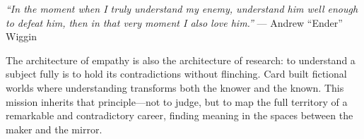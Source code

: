 \documentclass[11pt,letterpaper]{article}
\begin{document}
\vspace{1em}

\begin{quotebox}
\textit{``In the moment when I truly understand my enemy, understand him well enough to defeat him, then in that very moment I also love him.''} --- Andrew ``Ender'' Wiggin

\vspace{0.5em}

The architecture of empathy is also the architecture of research: to understand a subject fully is to hold its contradictions without flinching. Card built fictional worlds where understanding transforms both the knower and the known. This mission inherits that principle---not to judge, but to map the full territory of a remarkable and contradictory career, finding meaning in the spaces between the maker and the mirror.
\end{quotebox}
\end{document}
